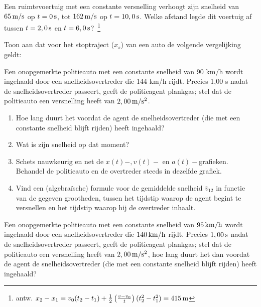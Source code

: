 \documentclass{ximera}
\begin{document}
\begin{exercise} Een ruimtevoertuig met een constante versnelling verhoogt
zijn snelheid van $65\rm\,m/s$ op $t=0\rm\,s$, tot $162\rm\,m/s$ op
$t=10,0\rm\,s$. Welke afstand legde dit voertuig af tussen
$t=2,0\rm\,s$ en $t=6,0\rm\,s$?~\footnote{antw.
$x_2-x_1=v_0(t_2-t_1)+\frac{1}{2}\left(\frac{v-v_0}{t}\right)(t_2^2-t_1^2)=415\rm\,m$}



\end{exercise}

\begin{exercise} Toon aan dat voor het stoptraject ($x_s$) van een auto de volgende vergelijking geldt:

\end{exercise}

\begin{exercise} Een onopgemerkte politieauto met
een constante snelheid van 90 km/h wordt ingehaald door een
snelheidsovertreder die 144 km/h rijdt. Precies 1,00 s nadat de
snelheidsovertreder passeert, geeft de politieagent plankgas; stel
dat de politieauto een versnelling heeft van $2,00\rm\,m/s^2$.
\begin{enumerate}
\item Hoe lang duurt het voordat de agent de snelheidsovertreder
(die met een constante snelheid blijft rijden) heeft ingehaald?
\item Wat is zijn snelheid op dat moment?
\item Schets nauwkeurig en net de $x(t)-,v(t)-$ en $a(t)-$grafieken.
Behandel de politieauto en de overtreder steeds in dezelfde grafiek.
\item Vind een (algebra\"ische) formule voor de gemiddelde snelheid $\overline{v}_{12}$ in
functie van de gegeven grootheden, tussen het tijdstip waarop de
agent begint te versnellen en het tijdstip waarop hij de overtreder
inhaalt.
\end{enumerate}

\end{exercise}

\begin{exercise} Een onopgemerkte politieauto met een constante snelheid van $95\rm\,km/h$ wordt ingehaald door een snelheidsovertreder die $140\rm\,km/h$ rijdt. Precies $1,00\rm\,s$ nadat de snelheidsovertreder passeert, geeft de politieagent plankgas; stel dat de politieauto een versnelling heeft van $2,00\rm\,m/s^2$, hoe lang duurt het dan voordat de agent de snelheidsovertreder (die met een constante snelheid blijft rijden) heeft ingehaald? 


\end{exercise}
\end{document}
